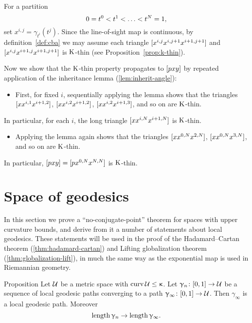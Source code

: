 For a partition \[0\z=t^0\z<t^1\z<\z\dots\z<t^N=1,\] 
set $x^{i,j}=\gamma_{t^i}(t^j)$. 
Since the line-of-sight map is continuous, 
by definition~\ref{def:cba} we may assume each triangle $[{x^{i,j}}{x^{i,j+1}}{x^{i+1,j+1}}]$ and $[{x^{i,j}}{x^{i+1,j}}{x^{i+1,j+1}}]$ is $\mathrm{K}$-thin 
(see Proposition~\ref{prop:k-thin}).

Now we show that the $\mathrm{K}$-thin property propagates to $[{p}{x}{y}]$ by repeated application of the inheritance lemma (\ref{lem:inherit-angle}):
\begin{itemize}
\item 
First, for fixed $i$, 
sequentially applying the lemma shows  that the triangles 
$[{x}{x^{i,1}}{x^{i+1,2}}]$, 
$[{x}{x^{i,2}}{x^{i+1,2}}]$, 
$[{x}{x^{i,2}}{x^{i+1,3}}]$,
and so on are $\mathrm{K}$-thin. 
\end{itemize}
In particular, for each $i$, the long triangle $[{x}{x^{i,N}}{x^{i+1,N}}]$ is $\mathrm{K}$-thin.
\begin{itemize} 
\item 
Applying the lemma again shows that the  triangles $[{x}{x^{0,N}}{x^{2,N}}]$, $[{x}{x^{0,N}}{x^{3,N}}]$, and so on are $\mathrm{K}$-thin. 
\end{itemize}
In particular, $[{p}{x}{y}]=[{p}{x^{0,N}}{x^{N,N}}]$ is $\mathrm{K}$-thin.
\qeds



\section{Space of geodesics}\label{sec:geod-space}

In this section we prove a  ``no-conjugate-point'' theorem for spaces with upper curvature bounds, and derive from it a number of statements about
local geodesics.  These statements will be used in the proof of the Hadamard--Cartan theorem (\ref{thm:hadamard-cartan}) and Lifting
 globalization theorem (\ref{thm:globalization-lift}), in much the same way as  the exponential map is used in Riemannian geometry.

\begin{thm}{Proposition}\label{prop:geo-complete}
Let $\mathcal{U}$ be a metric space with 
$\curv\spc{U}\le\kappa$.
 Let $\gamma_n\:[0,1]\to\spc{U}$ be a sequence of local geodesic paths converging to a path $\gamma_\infty\:[0,1]\to\spc{U}$.
Then $\gamma_\infty$ is a local geodesic path.
Moreover 
\[\length\gamma_n\to\length\gamma_\infty.\]
\end{thm}

